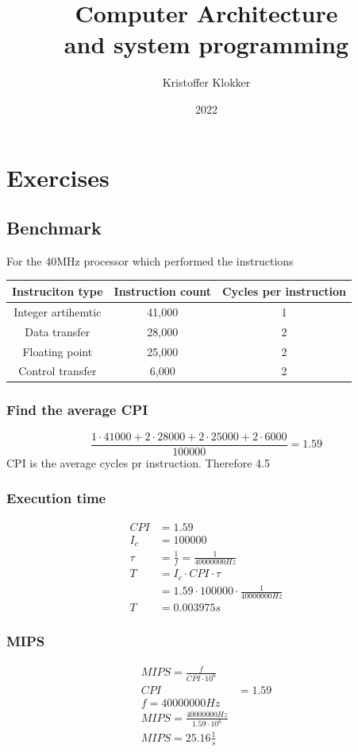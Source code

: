 \documentclass[12pt, a4paper]{article}
\title{Computer Architecture\\and system programming}
\date{2022}
\author{Kristoffer Klokker}
\begin{document}
	\maketitle
	\clearpage
	\tableofcontents
	\clearpage
	\section{Exercises}
		\subsection{Benchmark}
			For the 40MHz processor which performed the instructions\\[4mm]
			\begin{tabular}{c c c}
				 \hline
				 Instruciton type & Instruction count & Cycles per instruction\\
				 \hline
				 Integer artihemtic & 41,000 & 1\\
				 Data transfer & 28,000 & 2\\
				 Floating point & 25,000 & 2\\
				 Control transfer & 6,000 & 2\\
				 \hline
			\end{tabular}
			\subsubsection{Find the average CPI}
				$$\frac{1\cdot 41000+2\cdot 28000+2\cdot 25000 + 2\cdot 6000}{100000}=1.59$$
				CPI is the average cycles pr instruction. Therefore 4.5
			\subsubsection{Execution time}
				\begin{align*}
					CPI&=1.59\\
					I_c&=100000\\
					\tau&=\frac{1}{f}=\frac{1}{40000000Hz}\\
					 T&=I_c\cdot CPI \cdot \tau \\
					 &= 1.59\cdot 100000\cdot \frac{1}{40000000Hz}\\
					 T&=0.003975s
				\end{align*}
			\subsubsection{MIPS}
				\begin{align*}
					MIPS=\frac{f}{CPI\cdot 10^6}\\
					CPI&=1.59\\
					f=40000000Hz\\
					MIPS=\frac{40000000Hz}{1.59\cdot 10^6}\\
					MIPS=25.16\frac{1}{s}
				\end{align*}
\end{document}
